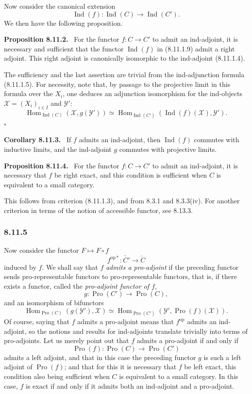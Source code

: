 \documentclass[11pt]{article}
\newcommand{\Hom}{\operatorname{Hom}}
\newcommand{\Ind}{\operatorname{Ind}}
\newcommand{\Pro}{\operatorname{Pro}}
\newcommand{\op}{\mathrm{op}}
\newcommand{\qedtext}{\hfill\(\square\)}
\newenvironment{statement}[1]{\par\medskip\noindent\textbf{#1.}\ }{\par\medskip}
\begin{document}
Now consider the canonical extension
\[
 \Ind(f):\Ind(C)\longrightarrow\Ind(C').
\tag{8.11.1.9}
\]
We then have the following proposition.

\begin{statement}{Proposition 8.11.2}
For the functor $f:C\to C'$ to admit an ind-adjoint, it is necessary and sufficient that the functor $\Ind(f)$ in (8.11.1.9) admit a right adjoint. This right adjoint is canonically isomorphic to the ind-adjoint (8.11.1.4).
\end{statement}

The sufficiency and the last assertion are trivial from the ind-adjunction formula (8.11.1.5). For necessity, note that, by passage to the projective limit in this formula over the $X_i$, one deduces an adjunction isomorphism for the ind-objects $\mathcal X=(X_i)_{i\in I}$ and $\mathcal Y'$:
\[
 \Hom_{\Ind(C)}(\mathcal X,g(\mathcal Y'))\simeq
 \Hom_{\Ind(C')}(\Ind(f)(\mathcal X),\mathcal Y').
\tag{8.11.2.1}
\]
\qedtext

\begin{statement}{Corollary 8.11.3}
If $f$ admits an ind-adjoint, then $\Ind(f)$ commutes with inductive limits, and the ind-adjoint $g$ commutes with projective limits.
\end{statement}

\begin{statement}{Proposition 8.11.4}
For the functor $f:C\to C'$ to admit an ind-adjoint, it is necessary that $f$ be right exact, and this condition is sufficient when $C$ is equivalent to a small category.
\end{statement}

This follows from criterion (8.11.1.3), and from 8.3.1 and 8.3.3(iv). For another criterion in terms of the notion of accessible functor, see 8.13.3.

\subsubsection*{8.11.5}
Now consider the functor $F\mapsto F\circ f$
\[
 f^{\op *}:\check{C'}\longrightarrow\check C
\tag{8.11.5.1}
\]
induced by $f$. We shall say that $f$ \emph{admits a pro-adjoint} if the preceding functor sends pro-representable functors to pro-representable functors, that is, if there exists a functor, called the \emph{pro-adjoint functor of $f$},
\[
 g:\Pro(C')\longrightarrow\Pro(C),
\tag{8.11.5.2}
\]
and an isomorphism of bifunctors
\[
 \Hom_{\Pro(C)}(g(\mathcal Y'),\mathcal X)\simeq
 \Hom_{\Pro(C')}(\mathcal Y',\Pro(f)(\mathcal X)).
\tag{8.11.5.3}
\]
Of course, saying that $f$ admits a pro-adjoint means that $f^\op$ admits an ind-adjoint, so the notions and results for ind-adjoints translate trivially into terms of pro-adjoints. Let us merely point out that $f$ admits a pro-adjoint if and only if
\[
 \Pro(f):\Pro(C)\longrightarrow\Pro(C')
\]
admits a left adjoint, and that in this case the preceding functor $g$ is such a left adjoint of $\Pro(f)$; and that for this it is necessary that $f$ be left exact, this condition also being sufficient when $C$ is equivalent to a small category. In this case, $f$ is exact if and only if it admits both an ind-adjoint and a pro-adjoint.
\end{document}
